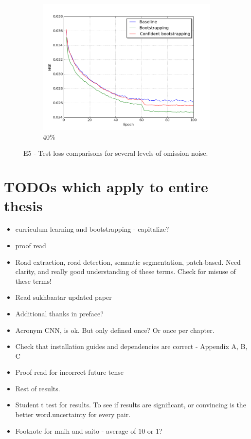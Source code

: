 \begin{figure}[H]
\begin{subfigure}{0.31\textwidth}
\end{subfigure}
\hspace*{\fill} %
\begin{subfigure}{0.31\textwidth}
\includegraphics[width=\textwidth]{figs/E5/lc_4.png}
\caption{40\%} \label{fig:app_E5_4_lc}
\vspace{0.2cm} %
\end{subfigure}
\caption{E5 - Test loss comparisons for several levels of omission noise.} \label{fig:E5_all_lc}
\end{figure}


\section{TODOs which apply to entire thesis}
\begin{itemize}
\item curriculum learning and bootstrapping - capitalize?
\item proof read
\item Road extraction, road detection, semantic segmentation, patch-based. Need clarity, and really good understanding of these terms. Check for misuse of these terms!
\item Read sukhbaatar updated paper
\item Additional thanks in preface?
\item Acronym CNN, is ok. But only defined once? Or once per chapter.
\item Check that installation guides and dependencies are correct - Appendix A, B, C
\item Proof read for incorrect future tense
\item Rest of results.
\item Student t test for results. To see if results are significant, or convincing is the better word.uncertainty for every pair.
\item Footnote for mnih and saito - average of 10 or 1?
\end{itemize}
 
